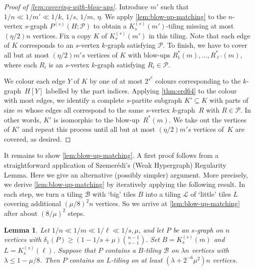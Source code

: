 \documentclass[12pt,reqno]{amsart}
\theoremstyle{plain}
\newtheorem{lemma}[theorem]{Lemma}
\theoremstyle{definition}
\numberwithin{equation}{section}
\renewcommand{\geq}{\geqslant}
\renewcommand{\leq}{\leqslant}
\renewcommand{\subset}{\subseteq}
\newcommand{\PG}[3]{{P^{(#3)}}(#1;#2)}
\newcommand{\cB}{\mathcal{B}}
\newcommand{\cL}{\mathcal{L}}
\newcommand{\cP}{\mathcal{P}}
\begin{document}
	\begin{proof}[Proof of \cref{lem:covering-with-blow-ups}]
		Introduce $m'$ such that $ 1/n \ll 1/m' \ll 1/k,\,1/s,\, 1/m ,\, \eta$.
		We apply \cref{lem:blow-up-matching} to the $n$-vertex $s$-graph $\PG{H}{ \cP }{s}$ to obtain a $K_s^{(s)}(m')$-tiling missing at most $(\eta/2) n$ vertices.
		Fix a copy $K$ of $K_s^{(s)}(m')$ in this tiling.
		Note that each edge of $K$ corresponds to an $s$-vertex $k$-graph satisfying $\cP$.
		To finish, we have to cover all but at most $(\eta/2) m's$ vertices of $K$ with blow-ups $R^\ast_1(m),\dots,R^\ast_{\ell'}(m)$, where each $R_i$ is an $s$-vertex $k$-graph satisfying $R_i \in \cP$.
		
		We colour each edge $Y$ of $K$ by one of at most $2^{s^{k}}$ colours corresponding to the $k$-graph~$H[Y]$ labelled by the part indices.
		Applying \cref{thm:erd64} to the colour with most edges, we identify a complete $s$-partite subgraph $K' \subset K$ with parts of size $m$ whose edges all correspond to the same $s$-vertex $k$-graph~$R$ with $R \in \cP$.
		In other words, $K'$ is isomorphic to the blow-up~$R^\ast(m)$.
		We take out the vertices of $K'$ and repeat this process until all but at most $(\eta/2) m's$ vertices of~$K$ are covered, as desired.
	\end{proof}
	
	It remains to show \cref{lem:blow-up-matching}.
	A first proof follows from a straightforward application of Szemerédi's (Weak Hypergraph) Regularity Lemma.
	Here we give an alternative (possibly simpler) argument.
	More precisely, we derive \cref{lem:blow-up-matching} by iteratively applying the following result.
	In each step, we turn a tiling $\cB$ with `big' tiles $B$ into a tiling $\cL$ of `little' tiles $L$ covering additional $(\mu/8)^2n$ vertices.
	So we arrive at \cref{lem:blow-up-matching} after about $(8/\mu)^2$ steps.
	
	\begin{lemma}\label{lem:larger-matching}
		Let	$1/n \ll 1/m \ll  1/\ell \ll 1/s, \mu$, and let $P$ be an $s$-graph on $n$ vertices with $\delta_1(P) \geq \left(1-1/s+ \mu \right) \binom{n-1}{s-1}$.
		Set $B = K_{s}^{(s)}(m)$ and $L= K_{s}^{(s)}(\ell)$.
		Suppose that $P$ contains a $B$-tiling $\cB$ on $\lambda n$ vertices with $\lambda \leq 1-\mu/8$.
		Then $P$ contains an $L$-tiling on at least $(\lambda + 2^{-6}\mu^2 ) n$ vertices.
	\end{lemma}
	
\end{document}
